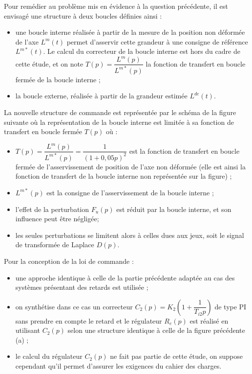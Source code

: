 \begin{multicols}{2}
Pour remédier au problème mis en évidence à la question précédente, il est envisagé une structure à deux boucles définies ainsi :
\begin{itemize}
\item une boucle interne réalisée à partir de la mesure de la position non déformée de l’axe $L^m(t)$ permet d’asservir cette grandeur à une consigne de référence $L^{m*}(t)$. Le calcul du correcteur de la boucle interne est hors du cadre de cette étude, et on note $T(p)=\dfrac{L^m(p)}{L^{m*}(p)}$ la fonction de transfert en boucle fermée de la boucle
interne ;
\item la boucle externe, réalisée à partir de la grandeur estimée $L^{de}(t)$.
\end{itemize}
La nouvelle structure de commande est représentée par le schéma de la figure suivante où la représentation de la
boucle interne est limitée à sa fonction de transfert en boucle fermée $T(p)$ où :
\begin{itemize}
\item $T(p) = \dfrac{L^m(p)}{L^{m*}(p)}= \dfrac{1}{\left(1+0,05p\right)^2}$ est la fonction de transfert en boucle fermée de l’asservissement de position de l’axe non déformée (elle est ainsi la fonction de transfert de la boucle interne non représentée sur la figure) ;
\item $L^{m*}(p)$ est la consigne de l’asservissement de la boucle interne ;
\item l’effet de la perturbation $F_u(p)$ est réduit par la boucle interne, et son influence peut être négligée;
\item les seules perturbations se limitent alors à celles dues aux jeux, soit le signal de transformée de Laplace $D(p)$.
\end{itemize}
Pour la conception de la loi de commande :
\begin{itemize}
\item une approche identique à celle de la partie précédente adaptée au cas des systèmes présentant des retards est utilisée ;
\item on synthétise dans ce cas un correcteur $C_2(p) = K_2 \left( 1+\dfrac{1}{T_{i2}p}\right) $ de type PI sans prendre en compte le retard et le régulateur $R_e(p)$ est réalisé en utilisant $C_2(p)$ selon une structure identique à celle de la figure précédente (a) ;
\item le calcul du régulateur $C_2(p)$ ne fait pas partie de cette étude, on suppose cependant qu’il permet d’assurer les exigences du cahier des charges.
\end{itemize}



\end{multicols}
